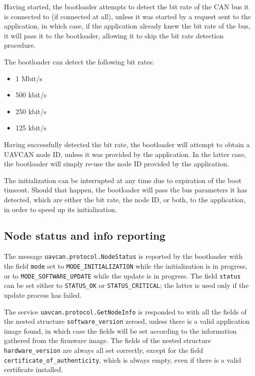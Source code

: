\documentclass{zubaxdoc}
\begin{document}
	Having started, the bootloader attempts to detect the bit rate of the CAN bus it is connected to
	(if connected at all), unless it was started by a request sent to the application, in which case,
	if the application already knew the bit rate of the bus, it will pass it to the bootloader,
	allowing it to skip the bit rate detection procedure.
	
	The bootloader can detect the following bit rates:
	\begin{itemize}
		\item 1 Mbit/s
		\item 500 kbit/s
		\item 250 kbit/s
		\item 125 kbit/s
	\end{itemize}
	
	Having successfully detected the bit rate, the bootloader will attempt to obtain a UAVCAN node ID,
	unless it was provided by the application.
	In the latter case, the bootloader will simply re-use the node ID provided by the application.
	
	The initialization can be interrupted at any time due to expiration of the boot timeout.
	Should that happen, the bootloader will pass the bus parameters it has detected,
	which are either the bit rate, the node ID, or both, to the application,
	in order to speed up its initialization.
	
	\subsection{Node status and info reporting}
	
	The message \verb|uavcan.protocol.NodeStatus| is reported by the bootloader with the field
	\verb|mode| set to \verb|MODE_INITIALIZATION| while the initialization is in progress,
	or to \verb|MODE_SOFTWARE_UPDATE| while the update is in progress.
	The field \verb|status| can be set either to \verb|STATUS_OK| or \verb|STATUS_CRITICAL|;
	the latter is used only if the update process has failed.
	
	The service \verb|uavcan.protocol.GetNodeInfo| is responded to with all the fields of the nested structure
	\verb|software_version| zeroed, unless there is a valid application image found,
	in which case the fields will be set according to the information gathered from the firmware image.
	The fields of the nested structure \verb|hardware_version| are always all set correctly,
	except for the field \verb|certificate_of_authenticity|, which is always empty, even if there is
	a valid certificate installed.
	
\end{document}
